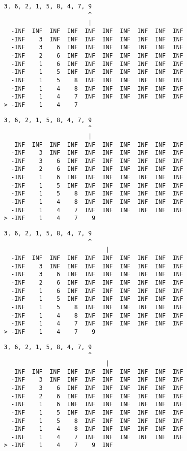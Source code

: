 { \begin{verbatim}
3, 6, 2, 1, 5, 8, 4, 7, 9
                        ^
                        |
  -INF  INF  INF  INF  INF  INF  INF  INF  INF  INF
  -INF    3  INF  INF  INF  INF  INF  INF  INF  INF
  -INF    3    6  INF  INF  INF  INF  INF  INF  INF
  -INF    2    6  INF  INF  INF  INF  INF  INF  INF
  -INF    1    6  INF  INF  INF  INF  INF  INF  INF
  -INF    1    5  INF  INF  INF  INF  INF  INF  INF
  -INF    1    5    8  INF  INF  INF  INF  INF  INF
  -INF    1    4    8  INF  INF  INF  INF  INF  INF
  -INF    1    4    7  INF  INF  INF  INF  INF  INF
> -INF    1    4    7                              
\end{verbatim} }

{ \begin{verbatim}
3, 6, 2, 1, 5, 8, 4, 7, 9
                        ^
                        |
  -INF  INF  INF  INF  INF  INF  INF  INF  INF  INF
  -INF    3  INF  INF  INF  INF  INF  INF  INF  INF
  -INF    3    6  INF  INF  INF  INF  INF  INF  INF
  -INF    2    6  INF  INF  INF  INF  INF  INF  INF
  -INF    1    6  INF  INF  INF  INF  INF  INF  INF
  -INF    1    5  INF  INF  INF  INF  INF  INF  INF
  -INF    1    5    8  INF  INF  INF  INF  INF  INF
  -INF    1    4    8  INF  INF  INF  INF  INF  INF
  -INF    1    4    7  INF  INF  INF  INF  INF  INF
> -INF    1    4    7    9                         
\end{verbatim} }

{ \begin{verbatim}
3, 6, 2, 1, 5, 8, 4, 7, 9
                        ^
                             |
  -INF  INF  INF  INF  INF  INF  INF  INF  INF  INF
  -INF    3  INF  INF  INF  INF  INF  INF  INF  INF
  -INF    3    6  INF  INF  INF  INF  INF  INF  INF
  -INF    2    6  INF  INF  INF  INF  INF  INF  INF
  -INF    1    6  INF  INF  INF  INF  INF  INF  INF
  -INF    1    5  INF  INF  INF  INF  INF  INF  INF
  -INF    1    5    8  INF  INF  INF  INF  INF  INF
  -INF    1    4    8  INF  INF  INF  INF  INF  INF
  -INF    1    4    7  INF  INF  INF  INF  INF  INF
> -INF    1    4    7    9                         
\end{verbatim} }

{ \begin{verbatim}
3, 6, 2, 1, 5, 8, 4, 7, 9
                        ^
                             |
  -INF  INF  INF  INF  INF  INF  INF  INF  INF  INF
  -INF    3  INF  INF  INF  INF  INF  INF  INF  INF
  -INF    3    6  INF  INF  INF  INF  INF  INF  INF
  -INF    2    6  INF  INF  INF  INF  INF  INF  INF
  -INF    1    6  INF  INF  INF  INF  INF  INF  INF
  -INF    1    5  INF  INF  INF  INF  INF  INF  INF
  -INF    1    5    8  INF  INF  INF  INF  INF  INF
  -INF    1    4    8  INF  INF  INF  INF  INF  INF
  -INF    1    4    7  INF  INF  INF  INF  INF  INF
> -INF    1    4    7    9  INF                    
\end{verbatim} }

